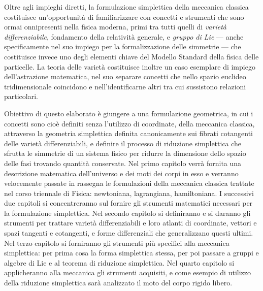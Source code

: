 Oltre agli impieghi diretti, la formulazione simplettica della meccanica classica costituisce un'opportunità di familiarizzare con concetti e strumenti che sono ormai onnipresenti nella fisica moderna, primi tra tutti quelli di \emph{varietà differenziabile}, fondamento della relatività generale, e \emph{gruppo di Lie} --- anche specificamente nel suo impiego per la formalizzazione delle simmetrie --- che costituisce invece uno degli elementi chiave del Modello Standard della fisica delle particelle. La teoria delle varietà costituisce inoltre un caso esemplare di impiego dell'astrazione matematica, nel suo separare concetti che nello spazio euclideo tridimensionale coincidono e nell'identificarne altri tra cui sussistono relazioni particolari.

Obiettivo di questo elaborato è giungere a una formulazione geometrica, in cui i concetti sono cioè definiti senza l'utilizzo di coordinate, della meccanica classica, attraverso la geometria simplettica definita canonicamente sui fibrati cotangenti delle varietà differenziabili, e definire il processo di riduzione simplettica che sfrutta le simmetrie di un sistema fisico per ridurre la dimensione dello spazio delle fasi trovando quantità conservate. Nel primo capitolo verrà fornita una descrizione matematica dell'universo e dei moti dei corpi in esso e verranno velocemente passate in rassegna le formulazioni della meccanica classica trattate nel corso triennale di Fisica: newtoniana, lagrangiana, hamiltoniana. I successivi due capitoli si concentreranno sul fornire gli strumenti matematici necessari per la formulazione simplettica. Nel secondo capitolo si definiranno e si daranno gli strumenti per trattare varietà differenziabili e loro atlanti di coordinate, vettori e spazi tangenti e cotangenti, e forme differenziali che generalizzano questi ultimi. Nel terzo capitolo si forniranno gli strumenti più specifici alla meccanica simplettica: per prima cosa la forma simplettica stessa, per poi passare a gruppi e algebre di Lie e al teorema di riduzione simplettica. Nel quarto capitolo si applicheranno alla meccanica gli strumenti acquisiti, e come esempio di utilizzo della riduzione simplettica sarà analizzato il moto del corpo rigido libero.